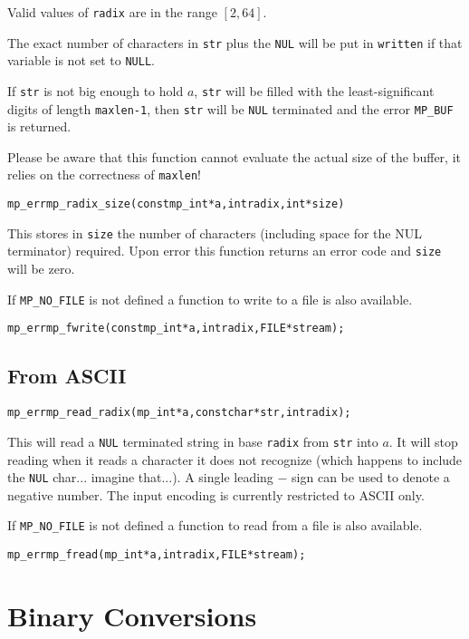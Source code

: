 \documentclass[synpaper]{book}
\begin{document}
Valid values of \texttt{radix} are in the range $[2, 64]$.

The exact number of characters in \texttt{str} plus the \texttt{NUL} will be put in \texttt{written} if that variable is not set to \texttt{NULL}.

If \texttt{str} is not big enough to hold $a$, \texttt{str} will be filled with the least-significant digits
of length \texttt{maxlen-1}, then \texttt{str} will be \texttt{NUL} terminated and the error \texttt{MP\_BUF} is returned.

Please be aware that this function cannot evaluate the actual size of the buffer, it relies on the correctness of \texttt{maxlen}!


\begin{alltt}
mp_err mp_radix_size (const mp_int *a, int radix, int *size)
\end{alltt}
This stores in \texttt{size} the number of characters (including space for the NUL terminator) required.  Upon error this
function returns an error code and \texttt{size} will be zero.

If \texttt{MP\_NO\_FILE} is not defined a function to write to a file is also available.
\begin{alltt}
mp_err mp_fwrite(const mp_int *a, int radix, FILE *stream);
\end{alltt}


\subsection{From ASCII}
\begin{alltt}
mp_err mp_read_radix (mp_int *a, const char *str, int radix);
\end{alltt}
This will read a \texttt{NUL} terminated string in base \texttt{radix} from \texttt{str} into $a$.  It will stop reading when it reads a
character it does not recognize (which happens to include the \texttt{NUL} char... imagine that...).  A single leading $-$ sign
can be used to denote a negative number.
The input encoding is currently restricted to ASCII only.

If \texttt{MP\_NO\_FILE} is not defined a function to read from a file is also available.
\begin{alltt}
mp_err mp_fread(mp_int *a, int radix, FILE *stream);
\end{alltt}


\section{Binary Conversions}
\end{document}

